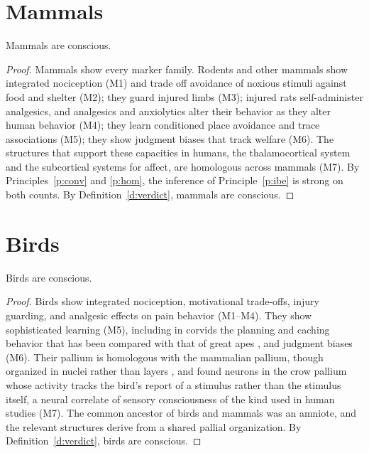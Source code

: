 \documentclass{situationist-preprint}
\begin{document}
\section{Mammals}

\begin{lemma}\label{l:mammals}
Mammals are conscious.
\end{lemma}

\begin{proof}
Mammals show every marker family. Rodents and other mammals show integrated nociception (M1) and trade off avoidance of noxious stimuli against food and shelter (M2); they guard injured limbs (M3); injured rats self-administer analgesics, and analgesics and anxiolytics alter their behavior as they alter human behavior (M4); they learn conditioned place avoidance and trace associations (M5); they show judgment biases that track welfare (M6). The structures that support these capacities in humans, the thalamocortical system and the subcortical systems for affect, are homologous across mammals (M7). By Principles~\ref{p:conv} and \ref{p:hom}, the inference of Principle~\ref{p:ibe} is strong on both counts. By Definition~\ref{d:verdict}, mammals are conscious.
\end{proof}

\section{Birds}

\begin{lemma}\label{l:birds}
Birds are conscious.
\end{lemma}

\begin{proof}
Birds show integrated nociception, motivational trade-offs, injury guarding, and analgesic effects on pain behavior (M1--M4). They show sophisticated learning (M5), including in corvids the planning and caching behavior that has been compared with that of great apes \citep{Emery2004}, and judgment biases (M6). Their pallium is homologous with the mammalian pallium, though organized in nuclei rather than layers \citep{Jarvis2005}, and \citet{Nieder2020} found neurons in the crow pallium whose activity tracks the bird's report of a stimulus rather than the stimulus itself, a neural correlate of sensory consciousness of the kind used in human studies (M7). The common ancestor of birds and mammals was an amniote, and the relevant structures derive from a shared pallial organization. By Definition~\ref{d:verdict}, birds are conscious.
\end{proof}
\end{document}
